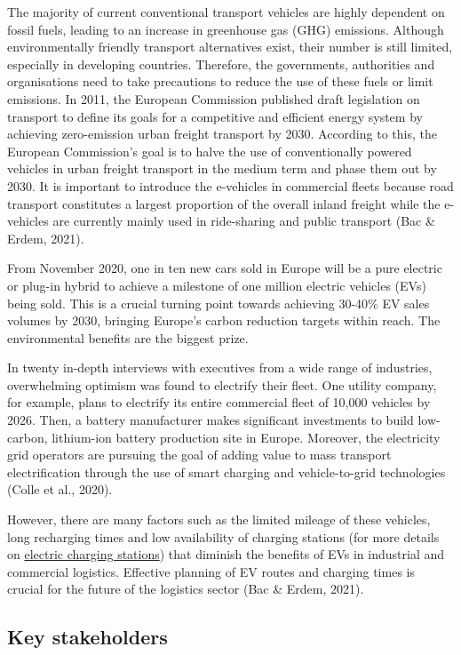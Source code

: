 \documentclass[
]{book}
\begin{document}
The majority of current conventional transport vehicles are highly dependent on fossil fuels, leading to an increase in greenhouse gas (GHG) emissions. Although environmentally friendly transport alternatives exist, their number is still limited, especially in developing countries. Therefore, the governments, authorities and organisations need to take precautions to reduce the use of these fuels or limit emissions. In 2011, the European Commission published draft legislation on transport to define its goals for a competitive and efficient energy system by achieving zero-emission urban freight transport by 2030. According to this, the European Commission's goal is to halve the use of conventionally powered vehicles in urban freight transport in the medium term and phase them out by 2030. It is important to introduce the e-vehicles in commercial fleets because road transport constitutes a largest proportion of the overall inland freight while the e-vehicles are currently mainly used in ride-sharing and public transport (Bac \& Erdem, 2021).

From November 2020, one in ten new cars sold in Europe will be a pure electric or plug-in hybrid to achieve a milestone of one million electric vehicles (EVs) being sold. This is a crucial turning point towards achieving 30-40\% EV sales volumes by 2030, bringing Europe's carbon reduction targets within reach. The environmental benefits are the biggest prize.

In twenty in-depth interviews with executives from a wide range of industries, overwhelming optimism was found to electrify their fleet. One utility company, for example, plans to electrify its entire commercial fleet of 10,000 vehicles by 2026. Then, a battery manufacturer makes significant investments to build low-carbon, lithium-ion battery production site in Europe. Moreover, the electricity grid operators are pursuing the goal of adding value to mass transport electrification through the use of smart charging and vehicle-to-grid technologies (Colle et al., 2020).

However, there are many factors such as the limited mileage of these vehicles, long recharging times and low availability of charging stations (for more details on \protect\hyperlink{charging_station}{electric charging stations}) that diminish the benefits of EVs in industrial and commercial logistics. Effective planning of EV routes and charging times is crucial for the future of the logistics sector (Bac \& Erdem, 2021).

\hypertarget{key-stakeholders-27}{%
\subsection*{Key stakeholders}\label{key-stakeholders-27}}
\end{document}

